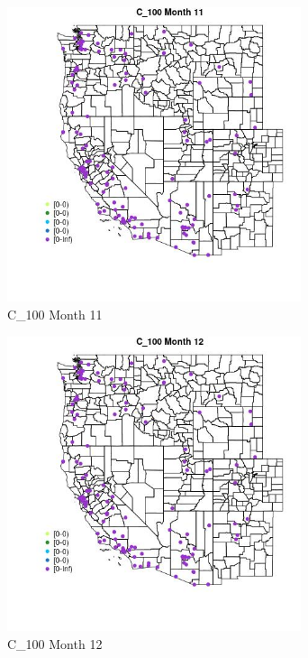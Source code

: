 \begin{figure} 
\centering  
\includegraphics[width=0.77\textwidth]{Code_Outputs/Report_ML_input_PM25_Step4_part_e_de_duplicated_aves_MapObsMo11C_100.jpg} 
\caption{\label{fig:Report_ML_input_PM25_Step4_part_e_de_duplicated_avesMapObsMo11C_100}C_100 Month 11} 
\end{figure} 
 

\begin{figure} 
\centering  
\includegraphics[width=0.77\textwidth]{Code_Outputs/Report_ML_input_PM25_Step4_part_e_de_duplicated_aves_MapObsMo12C_100.jpg} 
\caption{\label{fig:Report_ML_input_PM25_Step4_part_e_de_duplicated_avesMapObsMo12C_100}C_100 Month 12} 
\end{figure} 
 

